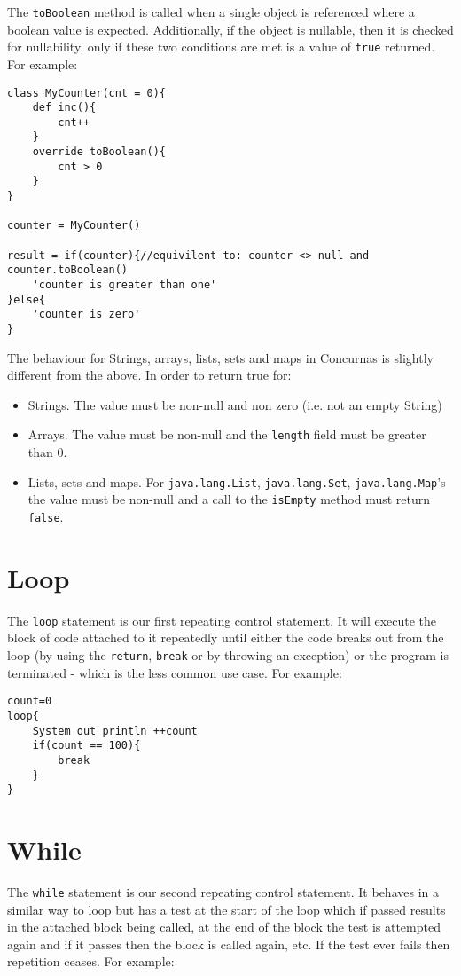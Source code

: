 \documentclass[conc-doc]{subfiles}
\begin{document}
The \lstinline{toBoolean} method is called when a single object is referenced where a boolean value is expected. Additionally, if the object is nullable, then it is checked for nullability, only if these two conditions are met is a value of  \lstinline{true} returned. For example:

\begin{lstlisting}
class MyCounter(cnt = 0){
	def inc(){
		cnt++
	}
	override toBoolean(){
		cnt > 0
	}
}

counter = MyCounter()

result = if(counter){//equivilent to: counter <> null and counter.toBoolean()
	'counter is greater than one' 
}else{
	'counter is zero'
}
\end{lstlisting}

The behaviour for Strings, arrays, lists, sets and maps in Concurnas is slightly different from the above. In order to return true for:

\begin{itemize}
	\item Strings. The value must be non-null and non zero (i.e. not an empty String)
	\item Arrays. The value must be non-null and the \lstinline{length} field must be greater than 0.
	\item Lists, sets and maps. For \lstinline{java.lang.List}, \lstinline{java.lang.Set}, \lstinline{java.lang.Map}'s the value must be non-null and a call to the \lstinline{isEmpty} method must return \lstinline{false}.
\end{itemize}

\section{Loop}
The \lstinline{loop} statement is our first repeating control statement. It will execute the block of code attached to it repeatedly until either the code breaks out from the loop (by using the \lstinline{return}, \lstinline{break} or by throwing an exception) or the program is terminated - which is the less common use case. For example:

\begin{lstlisting}
count=0
loop{
	System out println ++count
	if(count == 100){
		break
	}
}
\end{lstlisting}

\section{While}
The \lstinline{while} statement is our second repeating control statement. It behaves in a similar way to loop but has a test at the start of the loop which if passed results in the attached block being called, at the end of the block the test is attempted again and if it passes then the block is called again, etc. If the test ever fails then repetition ceases. For example:
\end{document}
